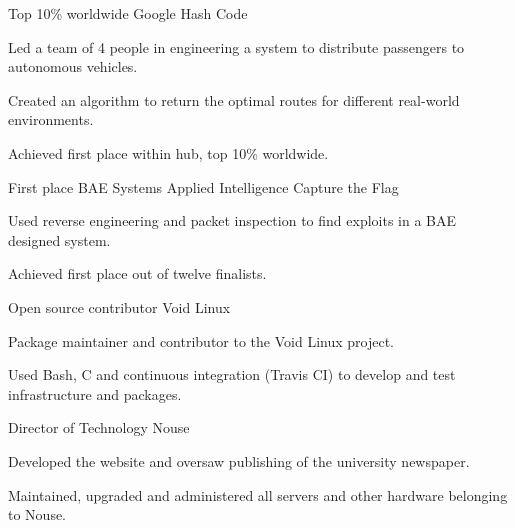 
\begin{cventries}
  \cventry
    {Top 10\% worldwide} %
    {Google Hash Code} %
    {} %
    {} %
    {
      \begin{cvitems} %
        \item {Led a team of 4 people in engineering a system to distribute passengers to autonomous vehicles.}
        \vspace{0.5mm}
        \item {Created an algorithm to return the optimal routes for different real-world environments.}
        \vspace{0.5mm}
        \item {Achieved first place within hub, top 10\% worldwide.}
      \end{cvitems}
    }
    
  \cventry
    {First place}
    {BAE Systems Applied Intelligence Capture the Flag}
    {}
    {}
    {
      \begin{cvitems}
        \item {Used reverse engineering and packet inspection to find exploits in a BAE designed system.}
        \vspace{0.5mm}
        \item {Achieved first place out of twelve finalists.}
      \end{cvitems}
    }
    
  \cventry
    {Open source contributor}
    {Void Linux}
    {}
    {}
    {
      \begin{cvitems}
        \item {Package maintainer and contributor to the Void Linux project.}
        \vspace{0.5mm}
        \item {Used Bash, C and continuous integration (Travis CI) to develop and test infrastructure and packages.}
      \end{cvitems}
    }
    
  \cventry
    {Director of Technology}
    {Nouse}
    {}
    {}
    {
      \begin{cvitems}
        \item {Developed the website and oversaw publishing of the university newspaper.}
        \vspace{0.5mm}
        \item {Maintained, upgraded and administered all servers and other hardware belonging to Nouse.}
      \end{cvitems}
    }


\end{cventries}
